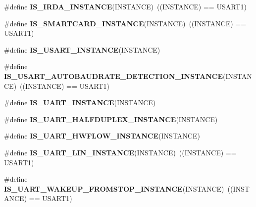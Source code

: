 \begin{DoxyCompactItemize}
\item 
\mbox{\label{group___exported__macro_ga98ae6698dc54d8441fce553a65bf5429}} 
\#define {\bfseries I\+S\+\_\+\+I\+R\+D\+A\+\_\+\+I\+N\+S\+T\+A\+N\+CE}(I\+N\+S\+T\+A\+N\+CE)~((I\+N\+S\+T\+A\+N\+CE) == U\+S\+A\+R\+T1)
\item 
\mbox{\label{group___exported__macro_gab2734c105403831749ccb34eeb058988}} 
\#define {\bfseries I\+S\+\_\+\+S\+M\+A\+R\+T\+C\+A\+R\+D\+\_\+\+I\+N\+S\+T\+A\+N\+CE}(I\+N\+S\+T\+A\+N\+CE)~((I\+N\+S\+T\+A\+N\+CE) == U\+S\+A\+R\+T1)
\item 
\#define {\bfseries I\+S\+\_\+\+U\+S\+A\+R\+T\+\_\+\+I\+N\+S\+T\+A\+N\+CE}(I\+N\+S\+T\+A\+N\+CE)
\item 
\mbox{\label{group___exported__macro_ga4130cef42f8cada5a91c38b85f76939e}} 
\#define {\bfseries I\+S\+\_\+\+U\+S\+A\+R\+T\+\_\+\+A\+U\+T\+O\+B\+A\+U\+D\+R\+A\+T\+E\+\_\+\+D\+E\+T\+E\+C\+T\+I\+O\+N\+\_\+\+I\+N\+S\+T\+A\+N\+CE}(I\+N\+S\+T\+A\+N\+CE)~((I\+N\+S\+T\+A\+N\+CE) == U\+S\+A\+R\+T1)
\item 
\#define {\bfseries I\+S\+\_\+\+U\+A\+R\+T\+\_\+\+I\+N\+S\+T\+A\+N\+CE}(I\+N\+S\+T\+A\+N\+CE)
\item 
\#define {\bfseries I\+S\+\_\+\+U\+A\+R\+T\+\_\+\+H\+A\+L\+F\+D\+U\+P\+L\+E\+X\+\_\+\+I\+N\+S\+T\+A\+N\+CE}(I\+N\+S\+T\+A\+N\+CE)
\item 
\#define {\bfseries I\+S\+\_\+\+U\+A\+R\+T\+\_\+\+H\+W\+F\+L\+O\+W\+\_\+\+I\+N\+S\+T\+A\+N\+CE}(I\+N\+S\+T\+A\+N\+CE)
\item 
\mbox{\label{group___exported__macro_ga7d2763df993c77cfa6e249ec7bc80482}} 
\#define {\bfseries I\+S\+\_\+\+U\+A\+R\+T\+\_\+\+L\+I\+N\+\_\+\+I\+N\+S\+T\+A\+N\+CE}(I\+N\+S\+T\+A\+N\+CE)~((I\+N\+S\+T\+A\+N\+CE) == U\+S\+A\+R\+T1)
\item 
\mbox{\label{group___exported__macro_ga6303097822ab1977cc83f05319a10f1e}} 
\#define {\bfseries I\+S\+\_\+\+U\+A\+R\+T\+\_\+\+W\+A\+K\+E\+U\+P\+\_\+\+F\+R\+O\+M\+S\+T\+O\+P\+\_\+\+I\+N\+S\+T\+A\+N\+CE}(I\+N\+S\+T\+A\+N\+CE)~((I\+N\+S\+T\+A\+N\+CE) == U\+S\+A\+R\+T1)
\item 
\mbox{\label{group___exported__macro_ga69e32d838272d886316fcfa378605ed0}} 

\end{DoxyCompactItemize}
